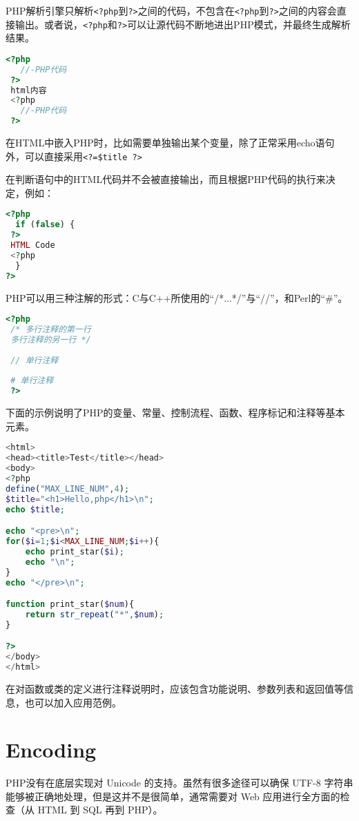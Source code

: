 PHP解析引擎只解析\texttt{<?php}到\texttt{?>}之间的代码，不包含在\texttt{<?php}到\texttt{?>}之间的内容会直接输出。或者说，\texttt{<?php}和\texttt{?>}可以让源代码不断地进出PHP模式，并最终生成解析结果。

\begin{lstlisting}[language=PHP]
 <?php
   //-PHP代码
 ?>
 html内容
 <?php
   //-PHP代码
 ?>
\end{lstlisting}



在HTML中嵌入PHP时，比如需要单独输出某个变量，除了正常采用echo语句外，可以直接采用\verb|<?=$title ?>|

在判断语句中的HTML代码并不会被直接输出，而且根据PHP代码的执行来决定，例如：


\begin{lstlisting}[language=PHP]
<?php
  if (false) {
 ?>
 HTML Code
 <?php
  }
?>
\end{lstlisting}

PHP可以用三种注解的形式：C与C++所使用的“/*...*/”与“//”，和Perl的“\#”。

\begin{lstlisting}[language=PHP]
 <?php
 /* 多行注释的第一行
 多行注释的另一行 */
 
 // 单行注释
 
 # 单行注释
 ?>
\end{lstlisting}


下面的示例说明了PHP的变量、常量、控制流程、函数、程序标记和注释等基本元素。



\begin{lstlisting}[language=PHP]
<html>
<head><title>Test</title></head>
<body>
<?php
define("MAX_LINE_NUM",4);
$title="<h1>Hello,php</h1>\n";
echo $title;

echo "<pre>\n";
for($i=1;$i<MAX_LINE_NUM;$i++){
    echo print_star($i);
    echo "\n";
}
echo "</pre>\n";

function print_star($num){
    return str_repeat("*",$num);
}

?>
</body>
</html>
\end{lstlisting}

在对函数或类的定义进行注释说明时，应该包含功能说明、参数列表和返回值等信息，也可以加入应用范例。


\chapter{Encoding}

PHP没有在底层实现对 Unicode 的支持。虽然有很多途径可以确保 UTF-8 字符串能够被正确地处理，但是这并不是很简单，通常需要对 Web 应用进行全方面的检查（从 HTML 到 SQL 再到 PHP）。


